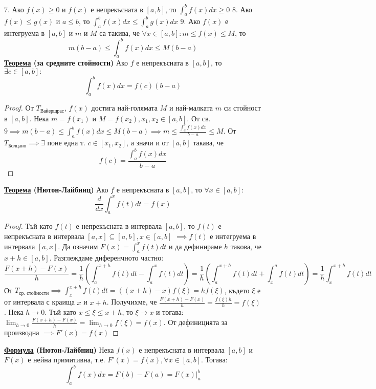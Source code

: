 \documentclass{article}
\begin{document}
$7.$ Ако $f(x) \geq 0$ и $f(x)$ е непрекъсната в $[a, b]$, то $\int_{a}^{b} f(x)dx \geq 0$ \newline\newline
$8.$ Ако $f(x) \leq g(x)$ и $a \leq b$, то $\int_{a}^{b} f(x)dx \leq \int_{a}^{b} g(x)dx$ \newline\newline
$9.$ Ако $f(x)$ е интегруема в $[a, b]$ и $m$ и $M$ са такива, че $\forall x \in [a, b]: m \leq f(x) \leq M$, то $$m(b - a) \leq
\int_{a}^{b} f(x)dx \leq M(b - a)$$ 
\textbf{\underline{Теорема} (за средните стойности)} \newline
Ако $f$ е непрекъсната в $[a, b]$, то $\exists c \in [a, b] : $ \[ \int_{a}^{b} f(x)dx = f(c)(b - a)\]
\begin{proof}
От $T_{\text{Вайерщрас}}$, $f(x)$ достига най-голямата $M$ и най-малката $m$ си стойност в $[a, b]$. Нека $m = f(x_1)$ и $M = 
f(x_2), x_1, x_2 \in [a, b]$. \newline От св. $9 \implies m(b - a) \leq \int_{a}^{b} f(x)dx \leq M(b - a) \implies m \leq
\frac{\int_{a}^{b} f(x)dx}{b - a} \leq M$. \newline От $T_{\text{Болцано}} \implies \exists$ поне една т. $c \in [x_1, x_2]$,
а значи и от $[a, b]$ такава, че $$f(c) = \frac{\int_{a}^{b} f(x)dx}{b - a}$$
\end{proof}
\textbf{\underline{Теорема} (Нютон-Лайбниц)} \newline
Ако $f$ е непрекъсната в $[a, b]$, то $\forall x \in [a, b] :$ \[ \frac{d}{dx} \int_{a}^{x} f(t)dt = f(x)\]
\begin{proof}
Тъй като $f(t)$ е непрекъсната в интервала $[a, b]$, то $f(t)$ е непрекъсната в интервала $[a, x] \subseteq [a, b], x \in [a, b]$
$\implies f(t)$ е интегруема в интервала $[a, x]$. Да означим $F(x) = \int_{a}^{x} f(t)dt$ и да дефинираме $h$ такова, че
$x + h \in [a, b]$. Разглеждаме диференчното частно: $$\frac{F(x + h) - F(x)}{h} = \frac{1}{h}(\int_{a}^{x + h} f(t)dt -
\int_{a}^{x} f(t)dt) = \frac{1}{h}(\int_{a}^{x + h} f(t)dt + \int_{x}^{a} f(t)dt) = \frac{1}{h}\int_{x}^{x + h} f(t)dt$$
От $T_{\text{ср. стойности}} \implies \int_{x}^{x + h} f(t)dt = ((x + h) - x)f(\xi) = hf(\xi)$, където $\xi$ е от интервала с
краища $x$ и $x + h$. Получихме, че $\frac{F(x + h) - F(x)}{h} = \frac{f(\xi)h}{h} = f(\xi)$. Нека $h \rightarrow 0$. Тъй като
$x \leq \xi \leq x + h$, то $\xi \rightarrow x$ и тогава: $\lim_{h \rightarrow 0}\frac{F(x + h) - F(x)}{h} = \lim_{h \rightarrow 0}
f(\xi) = f(x)$. От дефиницията за производна $\implies F'(x) = f(x)$
\end{proof}
\textbf{\underline{Формула} (Нютон-Лайбниц)} \newline
Нека $f(x)$ е непрекъсната в интервала $[a, b]$ и $F(x)$ е нейна примитивна, т.е. $F'(x) = f(x), \forall x \in [a, b]$. Тогава:
$$\int_{a}^{b}f(x)dx = F(b) - F(a) = F(x)|_a^b$$
\end{document}
